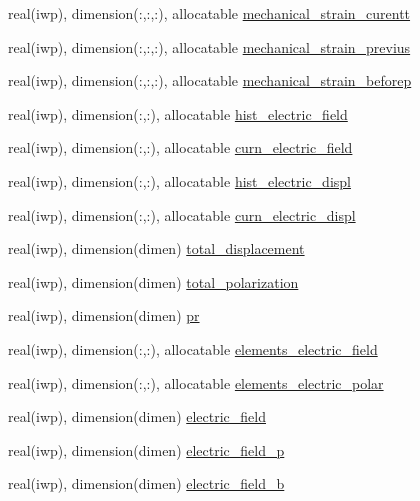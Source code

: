\begin{DoxyCompactItemize}
real(iwp), dimension(\+:,\+:,\+:), allocatable \hyperlink{classmaterial__behavior_a28bf20ae2381645c69a355195406bc98}{mechanical\+\_\+strain\+\_\+curentt}
\item 
real(iwp), dimension(\+:,\+:,\+:), allocatable \hyperlink{classmaterial__behavior_ae927078b97fc1a3c225f69f105075674}{mechanical\+\_\+strain\+\_\+previus}
\item 
real(iwp), dimension(\+:,\+:,\+:), allocatable \hyperlink{classmaterial__behavior_ab3c89f08605d36b4bd0c2fdf4c9fd477}{mechanical\+\_\+strain\+\_\+beforep}
\item 
real(iwp), dimension(\+:,\+:), allocatable \hyperlink{classmaterial__behavior_ace02b6745ed2cee2b79ed543372bf0ff}{hist\+\_\+electric\+\_\+field}
\item 
real(iwp), dimension(\+:,\+:), allocatable \hyperlink{classmaterial__behavior_a35226defc9e95a951812134717beecf5}{curn\+\_\+electric\+\_\+field}
\item 
real(iwp), dimension(\+:,\+:), allocatable \hyperlink{classmaterial__behavior_aca4c7b3ca3838cec6677f204faccabfd}{hist\+\_\+electric\+\_\+displ}
\item 
real(iwp), dimension(\+:,\+:), allocatable \hyperlink{classmaterial__behavior_abd37805114cdc4a1f45c3b92bdda99cd}{curn\+\_\+electric\+\_\+displ}
\item 
real(iwp), dimension(dimen) \hyperlink{classmaterial__behavior_ace487f4e09f47f8f9cf484ca0ad22b69}{total\+\_\+displacement}
\item 
real(iwp), dimension(dimen) \hyperlink{classmaterial__behavior_a52ff28207d80e56f256a5430e2179f3d}{total\+\_\+polarization}
\item 
real(iwp), dimension(dimen) \hyperlink{classmaterial__behavior_a5e5bf5daab57f78f3551c9998660db4c}{pr}
\item 
real(iwp), dimension(\+:,\+:), allocatable \hyperlink{classmaterial__behavior_a21b3e10af3e83d240da32039cbbdadd8}{elements\+\_\+electric\+\_\+field}
\item 
real(iwp), dimension(\+:,\+:), allocatable \hyperlink{classmaterial__behavior_aa7c6508ed369f2f37762ce9b6c39c800}{elements\+\_\+electric\+\_\+polar}
\item 
real(iwp), dimension(dimen) \hyperlink{classmaterial__behavior_a3ade0d21c66ab32510bf21daeb7fc6a8}{electric\+\_\+field}
\item 
real(iwp), dimension(dimen) \hyperlink{classmaterial__behavior_a49ab2ce38e4c0c8efd718655af3ff7df}{electric\+\_\+field\+\_\+p}
\item 
real(iwp), dimension(dimen) \hyperlink{classmaterial__behavior_a05e1e699be346a40a312263aed02b288}{electric\+\_\+field\+\_\+b}
\end{DoxyCompactItemize}


